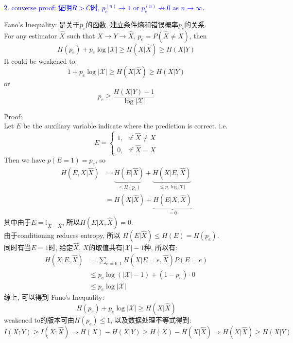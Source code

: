 \textcolor{blue}{2. converse proof: 证明$R>C$时, $p_e^{(n)}\to 1$ or $p_e^{(n)}\not\to 0$ as $n\to\infty$.}

\begin{definition}
Fano's Inequality: 是关于$p_e$的函数, 建立条件熵和错误概率$p_e$的关系. \\
For any estimator $\hat{X}$ such that $X\to Y\to \hat{X}$, $p_e=P(\hat{X}\neq X)$, then
$$H(p_e)+p_e\log\left|\mathcal{X}\right|\geq H(X|\hat{X})\geq H(X|Y)$$
It could be weakened to:
$$1+p_e\log\left|\mathcal{X}\right|\geq H(X|\hat{X})\geq H(X|Y)$$
or
$$p_e\geq \frac{H(X|Y)-1}{\log\left|\mathcal{X}\right|}$$
\end{definition}

Proof: \\
Let $E$ be the auxiliary variable indicate where the prediction is correct. i.e.
$$E=\begin{cases}
    1, & \text{if } \hat{X}\neq X \\
    0, & \text{if } \hat{X}=X
\end{cases}$$
Then we have $p(E=1)=p_e$, so
\begin{align*}
H\left(E,X|\hat{X}\right) &= \underbrace{H\left(E|\hat{X}\right)}_{\leq H(p_e)}+\underbrace{H\left(X|E,\hat{X}\right)}_{\leq p_e\log\left|\mathcal{X}\right|} \\
&= H\left(X|\hat{X}\right)+\underbrace{H\left(E|X,\hat{X}\right)}_{=0}
\end{align*}
其中由于$E=\mathbb{I}_{X=\hat{X}}$, 所以$H\left(E|X,\hat{X}\right)=0$. \\
由于conditioning reduces entropy, 所以 $H\left(E|\hat{X}\right)\leq H(E)=H(p_e)$. \\
同时有当$E=1$时, 给定$\hat{X}$, $X$的取值共有$\left|\mathcal{X}\right|-1$种, 所以有:
\begin{align*}
H\left(X|E, \hat{X}\right) &= \sum_{e=0,1}H\left(X|E=e, \hat{X}\right)P(E=e) \\
&\leq p_e\log\left(\left|\mathcal{X}\right|-1\right) + (1-p_e)\cdot 0 \\
&\leq p_e\log\left|\mathcal{X}\right|
\end{align*}
综上, 可以得到 Fano's Inequality:
$$H(p_e)+p_e\log\left|\mathcal{X}\right|\geq H(X|\hat{X})$$
weakened to的版本可由$H\left(p_e\right)\leq 1$, 以及数据处理不等式得到:
$$I(X;Y)\geq I(X;\hat{X})\Rightarrow H(X)-H(X|Y)\geq H(X)-H(X|\hat{X})\Rightarrow H(X|\hat{X})\geq H(X|Y)$$

